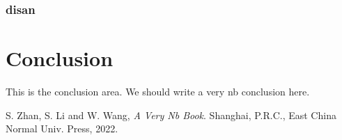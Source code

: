 \documentclass[lettersize,journal,12pt]{IEEEtran}
\begin{document}
\subsubsection{disan}

\section{Conclusion}

This is the conclusion area. We should write a very nb conclusion here.



\begin{thebibliography}{1}

	S. Zhan, S. Li and W. Wang, {\it{A Very Nb Book}}. Shanghai, P.R.C., East China Normal  Univ. Press, 2022.

\end{thebibliography}
\end{document}

